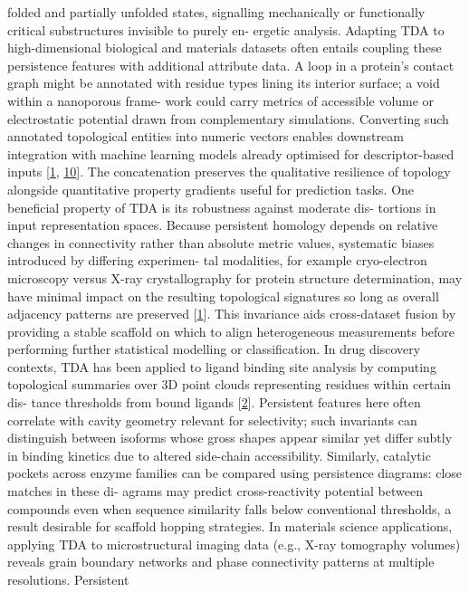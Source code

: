 \documentclass[
]{article}
\begin{document}
folded and partially unfolded states, signalling mechanically or
functionally critical substructures invisible to purely en- ergetic
analysis. Adapting TDA to high-dimensional biological and materials
datasets often entails coupling these persistence features with
additional attribute data. A loop in a protein's contact graph might be
annotated with residue types lining its interior surface; a void within
a nanoporous frame- work could carry metrics of accessible volume or
electrostatic potential drawn from complementary simulations. Converting
such annotated topological entities into numeric vectors enables
downstream integration with machine learning models already optimised
for descriptor-based inputs {[}\hyperref[_bookmark41]{1},
\hyperref[_bookmark50]{10}{]}. The concatenation preserves the
qualitative resilience of topology alongside quantitative property
gradients useful for prediction tasks. One beneficial property of TDA is
its robustness against moderate dis- tortions in input representation
spaces. Because persistent homology depends on relative changes in
connectivity rather than absolute metric values, systematic biases
introduced by differing experimen- tal modalities, for example
cryo-electron microscopy versus X-ray crystallography for protein
structure determination, may have minimal impact on the resulting
topological signatures so long as overall adjacency patterns are
preserved {[}\hyperref[_bookmark41]{1}{]}. This invariance aids
cross-dataset fusion by providing a stable scaffold on which to align
heterogeneous measurements before performing further statistical
modelling or classification. In drug discovery contexts, TDA has been
applied to ligand binding site analysis by computing topological
summaries over 3D point clouds representing residues within certain dis-
tance thresholds from bound ligands {[}\hyperref[_bookmark42]{2}{]}.
Persistent features here often correlate with cavity geometry relevant
for selectivity; such invariants can distinguish between isoforms whose
gross shapes appear similar yet differ subtly in binding kinetics due to
altered side-chain accessibility. Similarly, catalytic pockets across
enzyme families can be compared using persistence diagrams: close
matches in these di- agrams may predict cross-reactivity potential
between compounds even when sequence similarity falls below conventional
thresholds, a result desirable for scaffold hopping strategies. In
materials science applications, applying TDA to microstructural imaging
data (e.g., X-ray tomography volumes) reveals grain boundary networks
and phase connectivity patterns at multiple resolutions. Persistent
\end{document}
